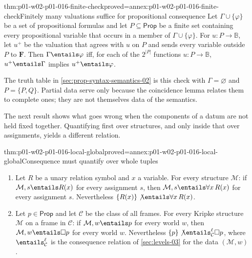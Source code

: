 \begin{hbtheorem}{thm:p01-w02-p01-016-finite-check}{proved=annex:p01-w02-p01-016-finite-check}{Finitely many valuations suffice for propositional consequence}
Let \(\Gamma\cup\{\varphi\}\) be a set of propositional formulas and let
\(P\subseteq\mathsf{Prop}\) be a finite set containing every propositional
variable that occurs in a member of \(\Gamma\cup\{\varphi\}\). For
\(u\colon P\to\mathbb B\), let \(u^{+}\) be the valuation that agrees with
\(u\) on \(P\) and sends every variable outside \(P\) to \(\mathbf F\). Then
\(\Gamma\entails\varphi\) iff, for each of the \(2^{\lvert P\rvert}\)
functions \(u\colon P\to\mathbb B\), \(u^{+}\entails\Gamma\) implies
\(u^{+}\entails\varphi\).
\end{hbtheorem}

The truth table in \cref{sec:prop-syntax-semantics-02} is this check with
\(\Gamma=\varnothing\) and \(P=\{P,Q\}\). Partial data serve only because the
coincidence lemma relates them to complete ones; they are not themselves data
of the semantics.

The next result shows what goes wrong when the components of a datum are not
held fixed together. Quantifying first over structures, and only inside that
over assignments, yields a different relation.

\begin{hbtheorem}{thm:p01-w02-p01-016-local-global}{proved=annex:p01-w02-p01-016-local-global}{Consequence must quantify over whole tuples}
\leavevmode
\begin{enumerate}
  \item Let \(R\) be a unary relation symbol and \(x\) a variable. For every
        structure \(\mathcal M\): if \(\mathcal M,s\entails R(x)\) for every
        assignment \(s\), then \(\mathcal M,s\entails\forall x\,R(x)\) for
        every assignment \(s\). Nevertheless
        \(\{R(x)\}\not\entails\forall x\,R(x)\).
  \item Let \(p\in\mathsf{Prop}\) and let \(\mathcal C\) be the class of all
        frames. For every Kripke structure \(\mathcal M\) on a frame in
        \(\mathcal C\): if \(\mathcal M,w\entails p\) for every world \(w\),
        then \(\mathcal M,w\entails\Box p\) for every world \(w\).
        Nevertheless \(\{p\}\not\entails^{\ell}_{\mathcal C}\Box p\), where
        \(\entails^{\ell}_{\mathcal C}\) is the consequence relation of
        \cref{sec:levels-03} for the data \((\mathcal M,w)\).
\end{enumerate}
\end{hbtheorem}


